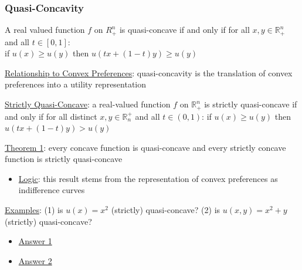 \documentclass{article}
\begin{document}
\subsubsection{Quasi-Concavity}
A real valued function $f$ on $R_{+}^{n}$ is quasi-concave if and only if for all $x, y \in \mathbb{R}_{+}^{n}$ and all $t \in [0,1]$: \\ if $u(x) \geq u(y)$ then $u(tx + (1-t)y) \geq u(y)$ \par \vspace{0.3em}
  \underline{Relationship to Convex Preferences}: quasi-concavity is the translation of convex preferences into a utility representation \par
  \underline{Strictly Quasi-Concave}: a real-valued function $f$ on $\mathbb{R}_{+}^{n}$ is strictly quasi-concave if and only if for all distinct $x, y \in \mathbb{R}^{+}_{n}$ and all $t \in (0,1)$: if $u(x) \geq u(y)$ then $u(tx + (1-t)y) > u(y)$
  \par
  \underline{Theorem 1}: every concave function is quasi-concave and every strictly concave function is strictly quasi-concave
  \begin{itemize}
    \item  \underline{Logic}: this result stems from the representation of convex preferences as indifference curves
  \end{itemize}
  \par
  \underline{Examples}: (1) is $u(x) = x^{2}$ (strictly) quasi-concave? (2) is $u(x,y) = x^{2} + y$ (strictly) quasi-concave?
  \begin{itemize}
    \item  \underline{Answer 1}
    \item  \underline{Answer 2}
  \end{itemize}
  \par
\vspace{6mm}
\end{document}
